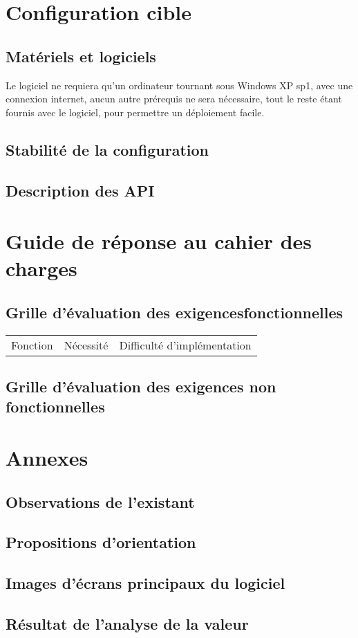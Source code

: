 \section{Configuration cible}
\subsection{Matériels et logiciels}
Le logiciel ne requiera qu'un ordinateur tournant sous Windows XP sp1, avec une connexion internet, aucun autre prérequis ne sera nécessaire, tout le reste étant fournis avec le logiciel, pour permettre un déploiement facile.
\subsection{Stabilité de la configuration}
\subsection{Description des API}

\section{Guide de réponse au cahier des charges}
\subsection{Grille d'évaluation des exigencesfonctionnelles}
\begin{tabular}{|c|c|c|}
	\hline Fonction & Nécessité & Difficulté d'implémentation
	\hline 
\end{tabular}
\subsection{Grille d'évaluation des exigences non fonctionnelles}

\section{Annexes}
\subsection{Observations de l'existant}
\subsection{Propositions d'orientation}
\subsection{Images d'écrans principaux du logiciel}
\subsection{Résultat de l'analyse de la valeur}